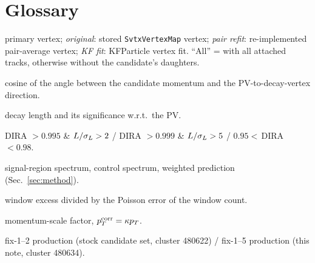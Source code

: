\section{Glossary}
\label{sec:glossary}
\begin{description}\small
\item[PV] primary vertex; \emph{original}: stored \texttt{SvtxVertexMap} vertex; \emph{pair refit}: re-implemented
  pair-average vertex; \emph{KF fit}: KFParticle vertex fit. ``All'' = with all attached tracks, otherwise without the
  candidate's daughters.
\item[DIRA] cosine of the angle between the candidate momentum and the PV-to-decay-vertex direction.
\item[$L$, \Ls] decay length and its significance w.r.t.\ the PV.
\item[pointing / tight / control] DIRA $>0.995$ \& $L/\sigma_L>2$ / DIRA $>0.999$ \& $L/\sigma_L>5$ / $0.95<$\,DIRA\,$<0.98$.
\item[$S$, $C$, $P$] signal-region spectrum, control spectrum, weighted prediction (Sec.~\ref{sec:method}).
\item[$z$] window excess divided by the Poisson error of the window count.
\item[$\kappa$] momentum-scale factor, $p_T^{\rm corr}=\kappa p_T$.
\item[v1 / v2] fix-1--2 production (stock candidate set, cluster 480622) / fix-1--5 production (this note, cluster 480634).
\end{description}
